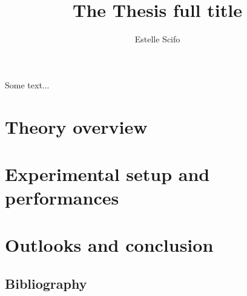 \documentclass[11pt, twoside, openright]{thesis}
\title{The Thesis full title}
\author{Estelle Scifo}
\begin{document}
\frontmatter

\maketitle

\dominitoc %


\begin{dedication}
  Some text... 
\end{dedication}




\newpage
\hypertarget{contents}{}
\tableofcontents




\mainmatter



\part{Theory overview}


\part{Experimental setup and performances}



\part{Outlooks and conclusion}



\chapter*{Bibliography}
\bibbysegment[heading=subbibliography]

\appendix



\backmatter

\end{document}
